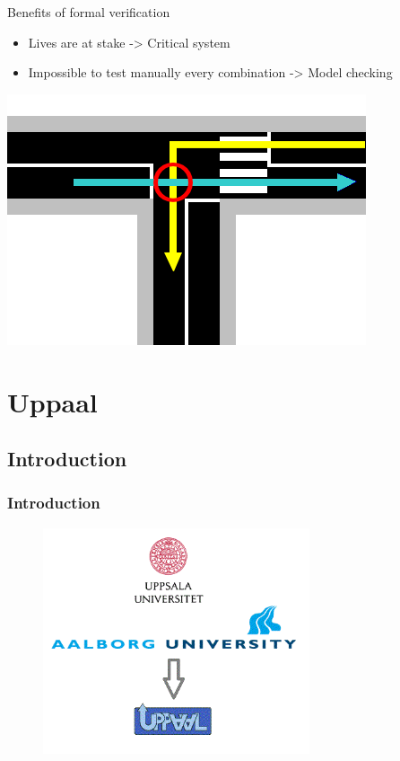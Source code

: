\documentclass{bredelebeamer}
\begin{document}




\begin{frame}{Benefits of formal verification}
 \begin{itemize}
\item Lives are at stake -> Critical system
\item Impossible to test manually every combination -> Model checking
\end{itemize}
\centering
\includegraphics[scale=0.4]{images/exempleCollision.png}
\end{frame}


\section{Uppaal}

\subsection{Introduction}
\begin{frame}
	\frametitle{Introduction}
	\begin{figure}
    	\centering
    	\includegraphics[width = 0.7\textwidth]{Uppaal.png}
  	\end{figure}
\end{frame}
\end{document}
